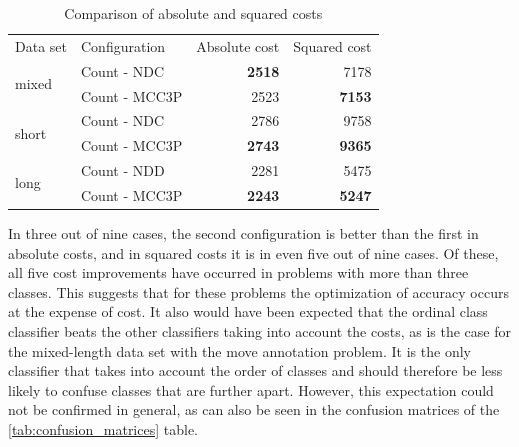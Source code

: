 \documentclass[article,type=msc,colorback,accentcolor=tud7b]{tudthesis}
\begin{document}
\begin{table}[H]
{\begin{tabular}{| l | l | r | r |}
		\cline{1-4}
		Data set & Configuration & Absolute cost & Squared cost \\ \cline{1-4}
		\multirow{2}{*}{mixed} & Count - NDC & \textbf{2518} & 7178 \\ \cline{2-4}
		 & Count - MCC3P & 2523 & \textbf{7153} \\ \cline{1-4}
		\multirow{2}{*}{short} & Count - NDC & 2786 & 9758 \\ \cline{2-4}
		 & Count - MCC3P & \textbf{2743} & \textbf{9365} \\ \cline{1-4}
		\multirow{2}{*}{long} & Count - NDD & 2281 & 5475 \\ \cline{2-4}
		 & Count - MCC3P & \textbf{2243} & \textbf{5247} \\ \cline{1-4}
	  \end{tabular}
      }
      \caption{Comparison of absolute and squared costs}
      \label{tab:comparison_costs}
	\end{table}

    In three out of nine cases, the second configuration is better than the first in absolute costs, and in squared costs it is in even five out of nine cases. Of these, all five cost improvements have occurred in problems with more than three classes. This suggests that for these problems the optimization of accuracy occurs at the expense of cost. It also would have been expected that the ordinal class classifier beats the other classifiers taking into account the costs, as is the case for the mixed-length data set with the move annotation problem. It is the only classifier that takes into account the order of classes and should therefore be less likely to confuse classes that are further apart. However, this expectation could not be confirmed in general, as can also be seen in the confusion matrices of the \ref{tab:confusion_matrices} table.    
  \clearpage  
  
\end{document}
